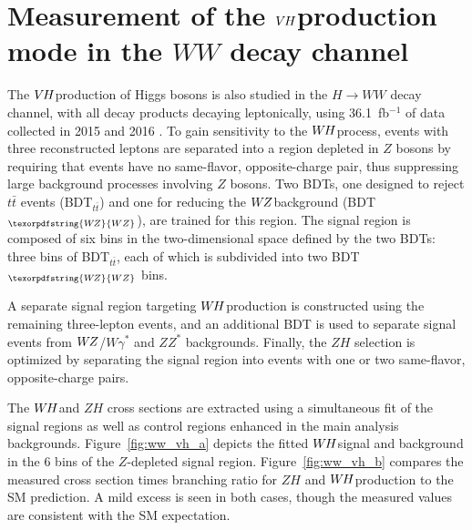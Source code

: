 \documentclass{moriond}
\def\wh{\texorpdfstring{\ensuremath{W\kern -0.1em H}\xspace}{WH\xspace}}
\def\wz{\texorpdfstring{\ensuremath{W\kern -0.1em Z}\xspace}{WZ\xspace}}
\def\vh{\texorpdfstring{\ensuremath{V\kern -0.1em H}\xspace}{VH\xspace}}
\def\zh{\ensuremath{ZH}\xspace}
\def\ttbar{\ensuremath{t\bar{t}}\xspace}
\begin{document}
\section{Measurement of the \vh production mode in the $WW$ decay channel} \label{sec:vh_ww}

The \vh production of Higgs bosons is also studied in the $H{\rightarrow}WW$ decay channel, with all
decay products decaying leptonically,
using 36.1~fb$^{-1}$ of data collected in 2015 and 2016 \cite{HIGG-2017-14}.
To gain sensitivity to the \wh process, events with three reconstructed leptons are separated into
a region depleted in $Z$ bosons by requiring that events have no same-flavor, opposite-charge pair,
thus suppressing large background processes involving $Z$ bosons. Two BDTs, one designed to reject
\ttbar events (BDT$_{\ttbar}$) and one for reducing the \wz background (BDT$_{\wz}$), are trained for
this region. The signal region is composed of six bins in the two-dimensional space defined by the two
BDTs: three bins of BDT$_{\ttbar}$, each of which is subdivided into two BDT$_{\wz}$ bins.

A separate signal region targeting \wh production is constructed using the remaining three-lepton
events, and an additional BDT is used to separate signal events from \wz/$W\gamma^*$ and $ZZ^*$
backgrounds. Finally, the \zh selection is optimized by separating the signal region into events with
one or two same-flavor, opposite-charge pairs.

The \wh and \zh cross sections are extracted using a simultaneous fit of the signal regions as well as
control regions enhanced in the main analysis backgrounds.
Figure~\ref{fig:ww_vh_a} depicts the fitted \wh signal and background in the 6 bins of the
$Z$-depleted signal region.
Figure~\ref{fig:ww_vh_b} compares the measured cross section times branching ratio for $ZH$ and \wh production
to the SM prediction. A mild excess is seen in both cases, though the measured values are
consistent with the SM expectation.
\end{document}
